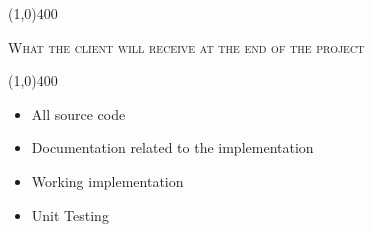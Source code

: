\documentclass[12pt,a4paper]{report}
\begin{document}
\begin{center}
	
	\line(1,0){400}\\
	{\scshape\large What the client will receive at the end of the project\par}
	\line(1,0){400}\\
	\end{center}
		\begin{itemize}
\item All source code
\item Documentation related to the implementation
\item Working implementation
\item Unit Testing
\end{itemize}
\end{document}

